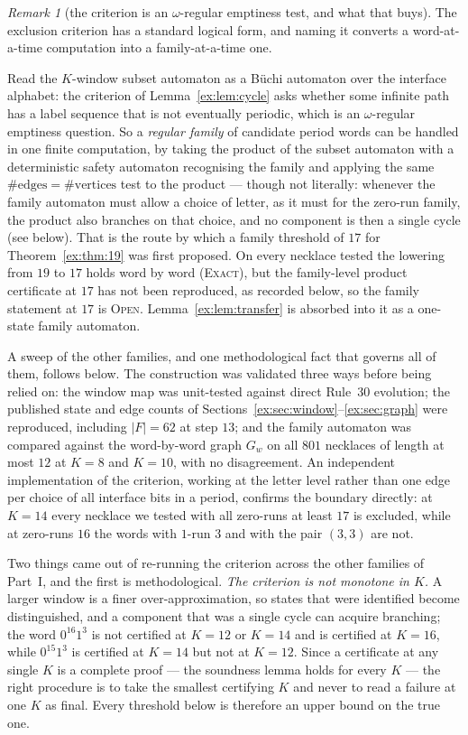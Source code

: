 \documentclass[11pt]{article}
\theoremstyle{definition}
\theoremstyle{remark}
\newtheorem{remark}[theorem]{Remark}
\newcommand{\EXACT}{\textsc{Exact}}
\newcommand{\OPEN}{\textsc{Open}}
\begin{document}
\begin{remark}[the criterion is an $\omega$-regular emptiness test, and what that buys]\label{ex:omega}
The exclusion criterion has a standard logical form, and naming it converts a word-at-a-time computation
into a family-at-a-time one.

Read the $K$-window subset automaton as a B\"uchi automaton over the interface alphabet: the criterion
of Lemma~\ref{ex:lem:cycle} asks whether some infinite path has a label sequence that is not eventually
periodic, which is an $\omega$-regular emptiness question. So a \emph{regular family} of candidate
period words can be handled in one finite computation, by taking the product of the subset automaton
with a deterministic safety automaton recognising the family and applying the same
$\#\text{edges}=\#\text{vertices}$ test to the product --- though not literally: whenever the family automaton
must allow a choice of letter, as it must for the zero-run family, the product also branches on that choice, and no
component is then a single cycle (see below). That is the route by which a family threshold of $17$ for Theorem~\ref{ex:thm:19} was
first proposed. On every necklace tested the lowering from $19$ to $17$ holds word by word (\EXACT), but
the family-level product certificate at $17$ has not been reproduced, as recorded below, so the family statement at $17$ is \OPEN.
Lemma~\ref{ex:lem:transfer} is absorbed into it as a one-state family automaton.

A sweep of the other families, and one methodological fact that governs all of them, follows below.
The construction was validated three ways before being relied on: the window map was unit-tested
against direct Rule~30 evolution; the published state and edge counts of Sections~\ref{ex:sec:window}--\ref{ex:sec:graph} were reproduced,
including $|F|=62$ at step $13$; and the family automaton was compared against the word-by-word graph
$G_w$ on all $801$ necklaces of length at most $12$ at $K=8$ and $K=10$, with no disagreement. An
independent implementation of the criterion, working at the letter level rather than one edge per
choice of all interface bits in a period, confirms the boundary directly: at $K=14$ every necklace we
tested with all zero-runs at least $17$ is excluded, while at zero-runs $16$ the words with $1$-run $3$
and with the pair $(3,3)$ are not.

Two things came out of re-running the criterion across the other families of Part~I, and the first is
methodological. \emph{The criterion is not monotone in $K$.} A larger window is a finer
over-approximation, so states that were identified become distinguished, and a component that was a
single cycle can acquire branching; the word $0^{16}1^3$ is not certified at $K=12$ or $K=14$ and is
certified at $K=16$, while $0^{15}1^3$ is certified at $K=14$ but not at $K=12$. Since a certificate at
any single $K$ is a complete proof --- the soundness lemma holds for every $K$ --- the right procedure
is to take the smallest certifying $K$ and never to read a failure at one $K$ as final. Every threshold
below is therefore an upper bound on the true one.


\end{remark}
\end{document}

